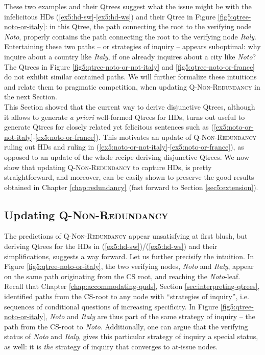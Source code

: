 These two examples and their Qtrees suggest what the issue might be with the infelicitous HDs (\ref{ex5:hd-sw}-\ref{ex5:hd-ws}) and their Qtree in Figure \ref{fig5:qtree-noto-or-italy}: in this Qtree, the path connecting the root to the verifying node \textit{Noto}, properly contains the path connecting the root to the verifying node \textit{Italy}. Entertaining these two paths -- or strategies of inquiry -- appears suboptimal: why inquire about a country like \textit{Italy}, if one already inquires about a city like \textit{Noto}? The Qtrees in Figure \ref{fig5:qtree-noto-or-not-italy} and \ref{fig5:qtree-noto-or-france} do not exhibit similar contained paths. We will further formalize these intuitions and relate them to pragmatic competition, when updating \textsc{Q-Non-Redundancy} in the next Section.\\


This Section showed that the current way to derive disjunctive Qtrees, although it allows to generate \textit{a priori} well-formed Qtrees for HDs, turns out useful to generate Qtrees for closely related yet felicitous sentences such as (\ref{ex5:noto-or-not-italy}-\ref{ex5:noto-or-france}). This motivates an update of \textsc{Q-Non-Redundancy} ruling out HDs and ruling in (\ref{ex5:noto-or-not-italy}-\ref{ex5:noto-or-france}), as opposed to an update of the whole recipe deriving disjunctive Qtrees. We now show that updating \textsc{Q-Non-Redundancy} to capture HDs, is pretty straightforward, and moreover, can be easily shown to preserve the good results obtained in Chapter \ref{chap:redundancy} (fast forward to Section \ref{sec5:extension}).
\subsection{Updating \textsc{Q-Non-Redundancy}}

The predictions of \textsc{Q-Non-Redundancy} appear unsatisfying at first blush, but deriving Qtrees for the HDs in (\ref{ex5:hd-sw})/(\ref{ex5:hd-ws}) and their simplifications, suggests a way forward. Let us further precisify the intuition. In Figure \ref{fig5:qtree-noto-or-italy}, the two verifying nodes, \textit{Noto} and \textit{Italy}, appear on the same path originating from the CS root, and reaching the \textit{Noto}-leaf. Recall that Chapter \ref{chap:accommodating-quds}, Section \ref{sec:interpreting-qtrees}, identified paths from the CS-root to any node with ``strategies of inquiry'', i.e. sequences of conditional questions of increasing specificity. In Figure \ref{fig5:qtree-noto-or-italy}, \textit{Noto} and \textit{Italy} are thus part of the same strategy of inquiry -- the path from the CS-root to \textit{Noto}. Additionally, one can argue that the verifying status of \textit{Noto} and \textit{Italy}, gives this particular strategy of inquiry a special status, as well: it is \textit{the} strategy of inquiry that converges to at-issue nodes.

